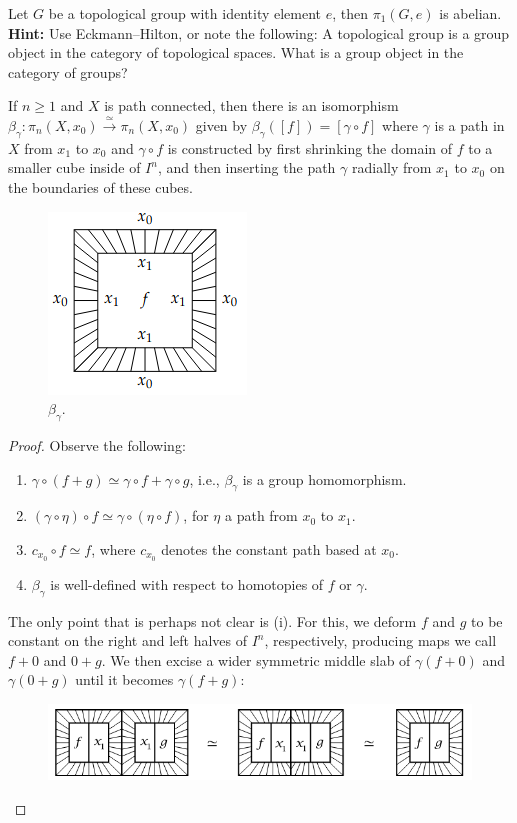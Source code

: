 \documentclass[ma3408.tex]{subfiles}
\begin{document}
\begin{exercise}{}{}
	Let $G$ be a topological group with identity element $e$, then $\pi_1(G,e)$ is abelian. \\
	\textbf{Hint: } Use Eckmann--Hilton, or note the following: A topological group is a group object in the category of topological spaces. What is a group object in the category of groups? 
\end{exercise}
\begin{Prop}
	If $n \ge 1$ and $X$ is path connected, then there is an isomorphism $\beta_{\gamma} : \pi_n(X, x_0) \xrightarrow{\simeq} \pi_n(X, x_0)$ given by $\beta_{\gamma}([ f ]) = [\gamma \circ f ]$ where $\gamma$ is a path in $X$ from $x_1$ to $x_0$ and $\gamma \circ f$ is constructed by first shrinking the domain of $f$ to a smaller cube inside of $I^n$, and then inserting the path $\gamma$ radially from $x_1$ to $x_0$ on the boundaries of these cubes.
	\begin{figure}[h] \centering\includegraphics[scale = 0.5]{path.png}\caption{$\beta_{\gamma}$.}\label{fig:path}\end{figure}
\end{Prop}
\begin{proof}
	Observe the following:
	\begin{enumerate}
		\item $\gamma \circ (f + g) \simeq \gamma \circ f + \gamma \circ g$, i.e., $\beta_{\gamma}$ is a group homomorphism.
		\item $(\gamma \circ \eta) \circ f \simeq \gamma \circ (\eta \circ f)$, for $\eta$ a path from $x_0$ to $x_1$. 
		\item $c_{x_0} \circ f \simeq f$, where $c_{x_0}$ denotes the constant path based at $x_0$. 
		\item $\beta_{\gamma}$ is well-defined with respect to homotopies of $f$ or $\gamma$. 
	\end{enumerate}

	The only point that is perhaps not clear is (i). For this, we deform $f$ and $g$ to be constant on the right and left halves of $I^n$, respectively, producing maps we call $f+0$ and $0 + g$. We then excise a wider symmetric middle slab of $\gamma(f+0)$  and $\gamma(0+g)$ until it becomes $\gamma(f+g)$:
\begin{figure}[h] \centering\includegraphics[scale = 0.5]{path_invariance.png}\end{figure}
\end{proof}
\end{document}
